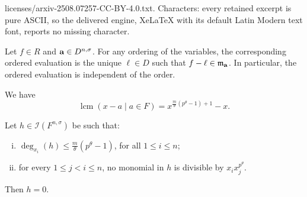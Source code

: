 \documentclass[10pt,a4paper]{amsart}
\DeclareMathOperator{\lcm}{lcm}
\begin{document}
licenses/arxiv-2508.07257-CC-BY-4.0.txt. Characters: every retained excerpt is pure ASCII, so the delivered engine, XeLaTeX with its default Latin Modern text font, reports no missing character.
\begin{cor}\label{cor:evalformon}
Let $f \in R$ and ${\bf a} \in D^{n,\sigma}$. For any ordering of the variables, the corresponding ordered evaluation is the unique $\ell \in D$ such that $f-\ell \in \mathfrak{m}_{{\bf a}}$. In particular, the ordered evaluation is independent of the order.
\end{cor}

\begin{lem}\label{lem:lcmfinifield}
We have
$$
\lcm(x-a \mid a \in F)=x^{\frac{m}{\theta}(p^\theta-1)+1}-x.
$$
\end{lem}

\begin{lem}\label{lem:nullvanismalldeg}
Let $h \in \mathscr{I}(F^{n,\sigma})$ be such that:
\begin{enumerate}[i)]
\item
$\deg_{x_{i}}(h) \leq \frac{m}{\theta}(p^\theta-1)$, for all $1 \leq i \leq n$; \label{eq1:lem:nullvanismalldeg}
\item for every $  1 \leq j<i\leq n$, no monomial in $h$ is divisible by $x_ix_j^{p^\theta}$.\label{eq2:lem:nullvanismalldeg}
\end{enumerate}
Then $h=0$.
\end{lem}
\end{document}
